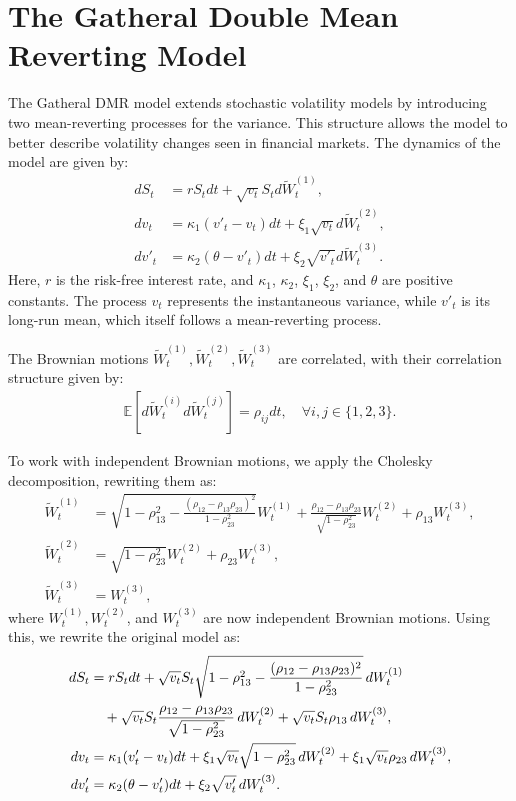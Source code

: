 \documentclass[graybox]{svmult}
\begin{document}
\section{The Gatheral Double Mean Reverting Model}
\label{subsec:2}

The Gatheral DMR model extends stochastic volatility models by introducing two mean-reverting processes for the variance. This structure allows the model to better describe volatility changes seen in financial markets. The dynamics of the model are given by:
\begin{align*}
dS_t &= rS_t dt + \sqrt{v_t} S_t d\widetilde{W}_t^{(1)}, \\
dv_t &= \kappa_1 (v'_t - v_t) dt + \xi_1 \sqrt{v_t} d\widetilde{W}_t^{(2)},\\
dv'_t &= \kappa_2 (\theta - v'_t) dt + \xi_2 \sqrt{v'_t} d\widetilde{W}_t^{(3)}.
\end{align*}
Here, $r$ is the risk-free interest rate, and $\kappa_1$, $\kappa_2$, $\xi_1$, $\xi_2$, and $\theta$ are positive constants. The process $v_t$ represents the instantaneous variance, while $v'_t$ is its long-run mean, which itself follows a mean-reverting process.

The Brownian motions $\widetilde{W}_t^{(1)}, \widetilde{W}_t^{(2)}, \widetilde{W}_t^{(3)}$ are correlated, with their correlation structure given by:
\begin{align*}
    \mathbb{E}[d\widetilde{W}_t^{(i)} d\widetilde{W}_t^{(j)}] = \rho_{ij} dt, \quad \forall i,j \in \{1,2,3\}.
\end{align*}

To work with independent Brownian motions, we apply the Cholesky decomposition, rewriting them as:
\begin{align*}
\widetilde{W}_t^{(1)} &= \sqrt{1 - \rho^2_{13} - \frac{(\rho_{12} - \rho_{13} \rho_{23})^2}{1 - \rho^2_{23}}} W_t^{(1)}
+ \frac{\rho_{12} - \rho_{13} \rho_{23}}{\sqrt{1 - \rho^2_{23}}} W_t^{(2)} + \rho_{13} W_t^{(3)}, \\
\widetilde{W}_t^{(2)} &= \sqrt{1 - \rho^2_{23}} W_t^{(2)} + \rho_{23} W_t^{(3)}, \\
\widetilde{W}_t^{(3)} &= W_t^{(3)},
\end{align*}
where $W_t^{(1)}, W_t^{(2)}$, and $W_t^{(3)}$ are now independent Brownian motions. Using this, we rewrite the original model as:
\begin{align*}
dS_t &= rS_t dt + \sqrt{v_t} S_t \sqrt{1 - \rho^2_{13} - \frac{(\rho_{12} - \rho_{13} \rho_{23})^2}{1 - \rho^2_{23}}} \, dW_t^{(1)} \\
&\quad + \sqrt{v_t} S_t \frac{\rho_{12} - \rho_{13} \rho_{23}}{\sqrt{1 - \rho^2_{23}}} \, dW_t^{(2)}
+ \sqrt{v_t} S_t \rho_{13} \, dW_t^{(3)}, \notag \\
dv_t &= \kappa_1 (v'_t - v_t) dt + \xi_1 \sqrt{v_t} \sqrt{1 - \rho^2_{23}} \, dW_t^{(2)}
+ \xi_1 \sqrt{v_t} \rho_{23} \, dW_t^{(3)}, \notag \\
dv'_t &= \kappa_2 (\theta - v'_t) dt + \xi_2 \sqrt{v'_t} \, dW_t^{(3)}. \notag
\end{align*}
\end{document}
